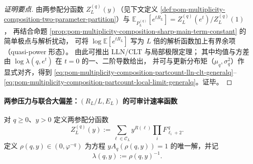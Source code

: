 \begin{proof}[证明要点]
由两参配分函数 \(Z_L^{(q)}(y)\)（见下文定义 \ref{def:pom-multiplicity-composition-two-parameter-partition}）与
\(
\mathbb{E}_{P_L^{(q)}}[e^{tR_L}]=Z_L^{(q)}(e^t)/Z_L^{(q)}(1)
\)，
再结合命题 \ref{prop:pom-multiplicity-composition-sharp-main-term-constant} 的简单极点与解析扰动，
可将 \(\log \mathbb{E}[e^{tR_L}]\) 写为 \(L\) 倍的解析函数加上有界余项（quasi-power 形态）。
由此可推出 LLN/CLT 与局部极限定理；
其中均值与方差由 \(\log\lambda(q,e^t)\) 在 \(t=0\) 的一、二阶导数给出，
并可与更新分布矩（\(\mu_q,\sigma_q^2\)）作显式对齐，得到 \eqref{eq:pom-multiplicity-composition-partcount-lln-clt-generalq}--\eqref{eq:pom-multiplicity-composition-partcount-local-limit-generalq}。证毕。
\end{proof}

\paragraph{两参压力与联合大偏差：\texorpdfstring{$(R_L/L,E_L)$}{(R\_L/L,E\_L)} 的可审计速率函数}
\begin{definition}\label{def:pom-multiplicity-composition-two-parameter-partition}
对 \(q\ge 0\)、\(y>0\) 定义两参配分函数
\[
Z_L^{(q)}(y):=\sum_{\boldsymbol{\ell}\in\mathcal{C}_L}y^{R(\boldsymbol{\ell})}\prod_i F_{\ell_i+2}^{\,q}.
\]
定义 \(\rho(q,y)\in(0,\varphi^{-q})\) 为方程
\(
yA_q(\rho(q,y))=1
\)
的唯一解，并记
\[
\boxed{\;\lambda(q,y):=\rho(q,y)^{-1}.\;}
\]
\end{definition}

